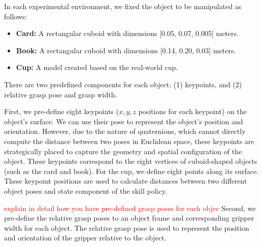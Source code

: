 In each experimental environment, we fixed the object to be manipulated as follows:
\begin{itemize}
    \item \textbf{Card:} A rectangular cuboid with dimensions [0.05, 0.07, 0.005] meters.
    \item \textbf{Book:} A rectangular cuboid with dimensions [0.14, 0.20, 0.03] meters.
    \item \textbf{Cup:} A model created based on the real-world cup.
\end{itemize}

% 


There are two predefined components for each object: (1) keypoints, and (2) relative grasp pose and grasp width.

First, we pre-define eight keypoints (\(x, y, z\) positions for each keypoint) on the object's surface. We can use their pose to represent the object's position and orientation. However, due to the nature of quaternions, which cannot directly compute the distance between two poses in Euclidean space, these keypoints are strategically placed to capture the geometry and spatial configuration of the object. These keypoints correspond to the eight vertices of cuboid-shaped objects (such as the card and book). For the cup, we define eight points along its surface. These keypoint positions are used to calculate distances between two different object poses and state component of the skill policy.

\textcolor{red}{explain in detail how you have pre-defined grasp poses for each objec}
Second, we pre-define the relative grasp poses to an object frame and corresponding gripper width for each object. The relative grasp pose is used to represent the position and orientation of the gripper relative to the object. 

